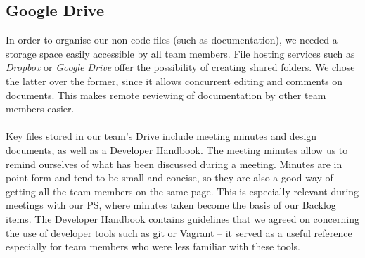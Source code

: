 \documentclass[a4paper, 10pt]{report}
\begin{document}
\subsection{Google Drive}
In order to organise our non-code files (such as documentation), we needed a storage space easily accessible by all team members. File hosting services such as \textit{Dropbox} or \textit{Google Drive} offer the possibility of creating shared folders. We chose the latter over the former, since it allows concurrent editing and comments on documents. This makes remote reviewing of documentation by other team members easier.\\\\
Key files stored in our team's Drive include meeting minutes and design documents, as well as a Developer Handbook. The meeting minutes allow us to remind ourselves of what has been discussed during a meeting. Minutes are in point-form and tend to be small and concise, so they are also a good way of getting all the team members on the same page. This is especially relevant during meetings with our PS, where minutes taken become the basis of our Backlog items. The Developer Handbook contains guidelines that we agreed on concerning the use of developer tools such as git or Vagrant -- it served as a useful reference especially for team members who were less familiar with these tools.
\end{document}
